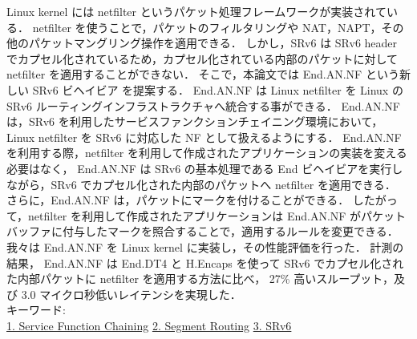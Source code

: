 Linux kernel には netfilter というパケット処理フレームワークが実装されている．
netfilter を使うことで，パケットのフィルタリングや NAT，NAPT，その他のパケットマングリング操作を適用できる．
しかし，SRv6 は SRv6 header でカプセル化されているため，カプセル化されている内部のパケットに対して netfilter を適用することができない．
そこで，本論文では End.AN.NF という新しい SRv6 ビヘイビア を提案する．
End.AN.NF は Linux netfilter を Linux の SRv6 ルーティングインフラストラクチャへ統合する事ができる．
End.AN.NF は，SRv6 を利用したサービスファンクションチェイニング環境において，
Linux netfilter を SRv6 に対応した NF として扱えるようにする．
End.AN.NF を利用する際，netfilter を利用して作成されたアプリケーションの実装を変える必要はなく，
End.AN.NF は SRv6 の基本処理である End ビヘイビアを実行しながら，SRv6 でカプセル化された内部のパケットへ netfilter を適用できる．
さらに，End.AN.NF は，パケットにマークを付けることができる．
したがって，netfilter を利用して作成されたアプリケーションは End.AN.NF がパケットバッファに付与したマークを照合することで，適用するルールを変更できる．
我々は End.AN.NF を Linux kernel に実装し，その性能評価を行った．
計測の結果， End.AN.NF は End.DT4 と H.Encaps を使って SRv6 でカプセル化された内部パケットに netfilter を適用する方法に比べ，
27\% 高いスループット，及び 3.0 マイクロ秒低いレイテンシを実現した．
~ \\
キーワード:\\
\underline{1. Service Function Chaining}
\underline{2. Segment Routing}
\underline{3. SRv6}
\begin{flushright}
\dept \\
\author
\end{flushright}
